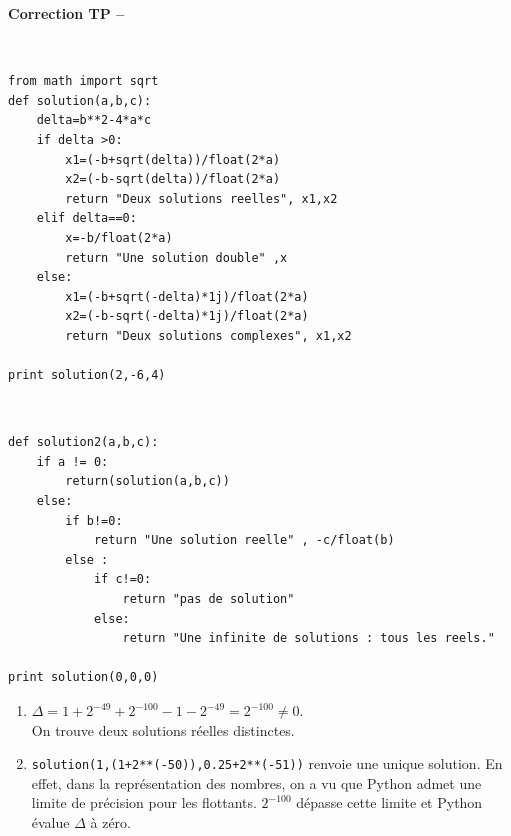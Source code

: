 \ifdef{\public}{}{}

\newpage 

\begin{center}
{\Large\bf Correction TP \no {\numero} -- \descrip}
\end{center}



\begin{solution}~\\
\vspace*{-0.7cm}
\begin{verbatim}
from math import sqrt
def solution(a,b,c):
	delta=b**2-4*a*c
	if delta >0:
		x1=(-b+sqrt(delta))/float(2*a)
		x2=(-b-sqrt(delta))/float(2*a)
		return "Deux solutions reelles", x1,x2
	elif delta==0:
		x=-b/float(2*a)
		return "Une solution double" ,x
	else:
		x1=(-b+sqrt(-delta)*1j)/float(2*a)
		x2=(-b-sqrt(-delta)*1j)/float(2*a)
		return "Deux solutions complexes", x1,x2			
		
print solution(2,-6,4)		
\end{verbatim}
\end{solution}



\begin{solution}
~\\
\vspace*{-0.7cm}
\begin{verbatim}
def solution2(a,b,c):
	if a != 0:
		return(solution(a,b,c))
	else:
		if b!=0:
			return "Une solution reelle" , -c/float(b)
		else :
			if c!=0:
				return "pas de solution"
			else:
				return "Une infinite de solutions : tous les reels."	

print solution(0,0,0)								
\end{verbatim}
\end{solution}



\begin{solution}
\begin{enumerate}
\item $\Delta=1+2^{-49}+2^{-100}-1-2^{-49}=2^{-100}\neq 0$.\\
On trouve deux solutions r\' eelles distinctes.
\item \verb?solution(1,(1+2**(-50)),0.25+2**(-51))? renvoie une unique solution. En effet, dans la repr\' esentation des nombres, on a vu que Python admet une limite de pr\' ecision pour les flottants. $2^{-100}$ d\' epasse cette limite et Python \' evalue $\Delta$ \` a z\' ero.
\end{enumerate}
\end{solution}





